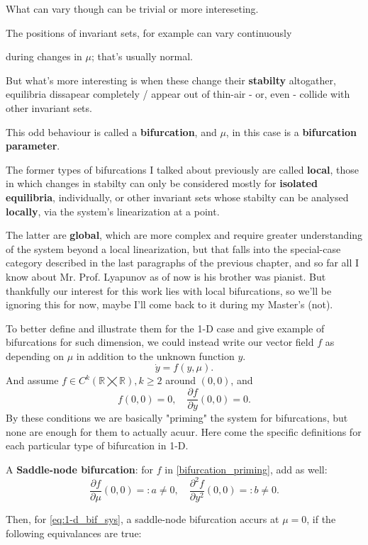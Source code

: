 What can vary though can be trivial or more intereseting.

The positions of invariant sets, for example can vary continuously

during changes in $\mu$; that's usually normal.

But what's more interesting is when these change their \textbf{stabilty} altogather, equilibria dissapear completely / appear out of thin-air - or, even - collide with other invariant sets.

This odd behaviour is called a \textbf{bifurcation}, and $\mu$, in this case is a \textbf{bifurcation parameter}.

The former types of bifurcations I talked about previously are called \textbf{local}, those in which changes in stabilty can only be considered mostly for \textbf{isolated equilibria}, individually, or other invariant sets whose stabilty can be analysed \textbf{locally}, via the system's linearization at a point.

The latter are \textbf{global}, which are more complex and require greater understanding of the system beyond a local linearization, but that falls into the special-case category described in the last paragraphs of the previous chapter, and so far all I know about Mr. Prof. Lyapunov as of now is his brother was pianist. But thankfully our interest for this work lies with local bifurcations, so we'll be ignoring this for now, maybe I'll come back to it during my Master's (not).

To better define and illustrate them for the 1-D case and give example of bifurcations for such dimension, we could instead write our vector field $f$ as depending on $\mu$ in addition to the unknown function $y$.
\begin{equation}\label{eq:1-d_bif_sys}
  \dot{y} = f(y, \mu).
\end{equation}
And assume $f \in C^k(\mathbb{R} \bigtimes \mathbb{R}), k \geq 2 $ around $(0,0)$, and
\begin{equation}\label{bifurcation_priming}
  f(0,0) = 0, \quad \frac{\partial f}{\partial y}(0,0) = 0.
\end{equation}
By these conditions we are basically "priming" the system for bifurcations, but none are enough for them to actually acuur. Here come the specific definitions for each particular type of bifurcation in 1-D.

\begin{definition}
  A \textbf{Saddle-node bifurcation}:
  for $f$ in \ref{bifurcation_priming}, add as well:
  \begin{equation*}
    \frac{\partial f}{\partial \mu}(0,0) =: a \neq 0, \quad \frac{\partial^2 f}{\partial y^2}(0,0) =:b \neq 0.
  \end{equation*}
\end{definition}
Then, for \ref{eq:1-d_bif_sys}, a saddle-node bifurcation accurs at $\mu = 0$, if the following equivalances are true:


